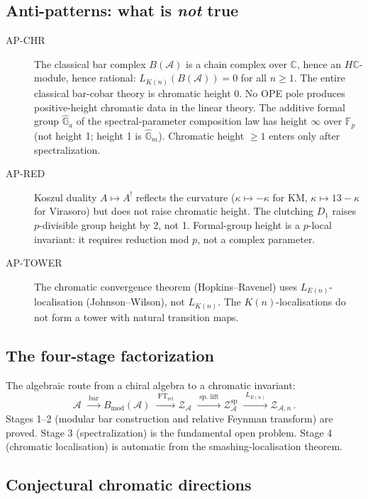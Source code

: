 \documentclass[11pt]{article}
\newcommand{\cA}{\mathcal{A}}
\newcommand{\cZ}{\mathcal{Z}}
\newcommand{\C}{\mathbb{C}}
\begin{document}
\subsection{Anti-patterns: what is \emph{not} true}

\begin{description}
\item[AP-CHR] The classical bar complex $B(\cA)$ is a chain complex
  over $\C$, hence an $H\C$-module, hence rational:
  $L_{K(n)}(B(\cA)) = 0$ for all $n \ge 1$.  The entire classical
  bar-cobar theory is chromatic height 0.  No OPE pole produces
  positive-height chromatic data in the linear theory.  The additive
  formal group $\hat{\mathbb{G}}_a$ of the spectral-parameter
  composition law has height $\infty$ over $\mathbb{F}_p$ (not height 1;
  height 1 is $\hat{\mathbb{G}}_m$).  Chromatic height $\ge 1$ enters
  only after spectralization.

\item[AP-RED] Koszul duality $A \mapsto A^!$ reflects the curvature
  ($\kappa \mapsto -\kappa$ for KM, $\kappa \mapsto 13 - \kappa$ for
  Virasoro) but does not raise chromatic height.  The clutching $D_1$
  raises $p$-divisible group height by 2, not 1.  Formal-group height
  is a $p$-local invariant: it requires reduction mod $p$, not a
  complex parameter.

\item[AP-TOWER] The chromatic convergence theorem (Hopkins--Ravenel) uses
  $L_{E(n)}$-localisation (Johnson--Wilson), not $L_{K(n)}$.  The
  $K(n)$-localisations do not form a tower with natural transition maps.
\end{description}

\subsection{The four-stage factorization}

The algebraic route from a chiral algebra to a chromatic invariant:
\[
  \cA
  \;\xrightarrow{\;\mathrm{bar}\;}
  B_{\mathrm{mod}}(\cA)
  \;\xrightarrow{\;\mathrm{FT}_{\mathrm{rel}}\;}
  \cZ_\cA
  \;\xrightarrow{\;\text{sp.\ lift}\;}
  \cZ_\cA^{\mathrm{sp}}
  \;\xrightarrow{\;L_{E(n)}\;}
  \cZ_{\cA,n}\,.
\]
Stages 1--2 (modular bar construction and relative Feynman transform) are
proved.  Stage 3 (spectralization) is the fundamental open problem.
Stage 4 (chromatic localisation) is automatic from the smashing-localisation
theorem.

\subsection{Conjectural chromatic directions}
\end{document}
